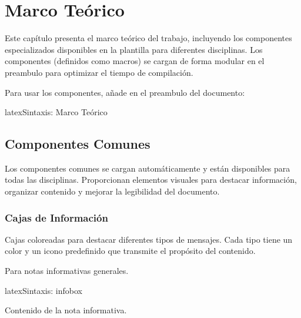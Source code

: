 \chapter{Marco Teórico}
\label{cap:marco-teorico}

Este capítulo presenta el marco teórico del trabajo, incluyendo los componentes
especializados disponibles en la plantilla para diferentes disciplinas.
Los componentes (definidos como \glspl{macro}) se cargan de forma modular
en el \gls{preambulo} para optimizar el tiempo de compilación.

Para usar los componentes, añade en el \gls{preambulo} del documento:

\begin{codigosimple}{latex}{Sintaxis: Marco Teórico}
\usepackage[all]{eps-componentes}  %
\usepackage[software,telecom]{eps-componentes}
\end{codigosimple}

\section{Componentes Comunes}
\label{sec:comp-comunes}

Los componentes comunes se cargan automáticamente y están disponibles para todas
las disciplinas. Proporcionan elementos visuales para destacar información,
organizar contenido y mejorar la legibilidad del documento.

\subsection{Cajas de Información}
\label{subsec:cajas-info}

Cajas coloreadas para destacar diferentes tipos de mensajes. Cada tipo tiene un
color y un icono predefinido que transmite el propósito del contenido.

Para notas informativas generales.

\begin{codigosimple}{latex}{Sintaxis: infobox}
\begin{infobox}
  Contenido de la nota informativa.
\end{infobox}
\end{codigosimple}

